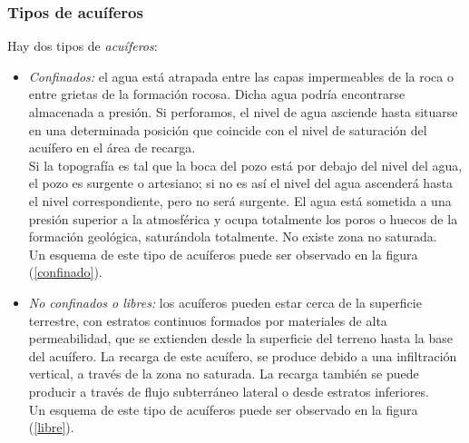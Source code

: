 \documentclass[10pt,a4paper,final]{article}
\begin{document}
\subsubsection*{Tipos de acuíferos}
Hay dos tipos de \emph{acuíferos}: 
\begin{itemize}
\item \emph{Confinados: }el agua está atrapada entre las capas impermeables de la roca o entre grietas de la formación rocosa. Dicha agua podría encontrarse almacenada a presión. Si perforamos, el nivel de agua asciende hasta situarse en una determinada posición que coincide con el nivel de saturación del acuífero en el área de recarga.\\
Si la topografía es tal que la boca del pozo está por debajo del nivel del agua, el pozo es
surgente o artesiano; si no es así el nivel del agua ascenderá hasta el nivel correspondiente, pero no será surgente. El agua está sometida a una presión superior a la atmosférica y ocupa totalmente los poros o huecos de la formación geológica, saturándola totalmente. No existe zona no saturada. \\ Un esquema de este tipo de acuíferos puede ser observado en la figura (\ref{confinado}).
%
\item \emph{No confinados o libres: } los acuíferos pueden estar cerca de la superficie terrestre, con estratos continuos formados por materiales de alta permeabilidad, que se extienden desde la superficie del terreno hasta la base del acuífero. La recarga de este acuífero, se produce debido a una infiltración vertical, a través de la zona no saturada. La recarga también se puede producir a través de flujo subterráneo lateral o desde estratos inferiores.\\
Un esquema de este tipo de acuíferos puede ser observado en la figura (\ref{libre}).
\end{itemize}
%
\end{document}
